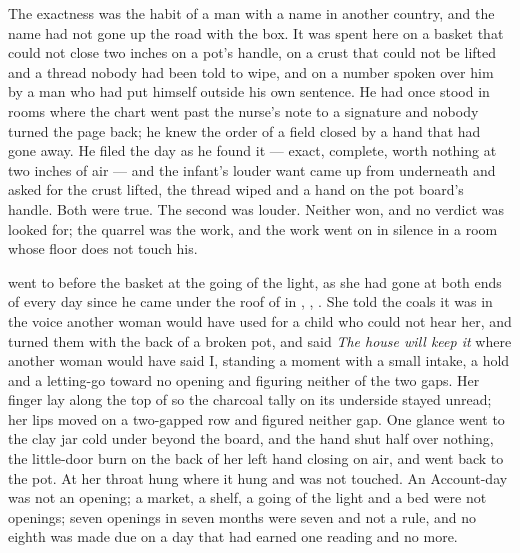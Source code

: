 The exactness was the habit of a man with a name in another country, and the name had not gone up the road with the box. It was spent here on a basket that could not close two inches on a pot's handle, on a crust that could not be lifted and a thread nobody had been told to wipe, and on a number spoken over him by a man who had put himself outside his own sentence. He had once stood in rooms where the chart went past the nurse's note to a signature and nobody turned the page back; he knew the order of a field closed by a hand that had gone away. He filed the day as he found it --- exact, complete, worth nothing at two inches of air --- and the infant's louder want came up from underneath and asked for the crust lifted, the thread wiped and a hand on the pot board's handle. Both were true. The second was louder. Neither won, and no verdict was looked for; the quarrel was the work, and the work went on in silence in a room whose floor does not touch his.

 went to  before the basket at the going of the light, as she had gone at both ends of every day since he came under the roof of  in , , . She told the coals it was  in the voice another woman would have used for a child who could not hear her, and turned them with the back of a broken pot, and said \emph{The house will keep it} where another woman would have said I, standing a moment with a small intake, a hold and a letting-go toward no opening and figuring neither of the two gaps. Her finger lay along the top of  so the charcoal tally on its underside stayed unread; her lips moved on a two-gapped row and figured neither gap. One glance went to the clay jar cold under  beyond the board, and the hand shut half over nothing, the little-door burn on the back of her left hand closing on air, and went back to the pot. At her throat  hung where it hung and was not touched. An Account-day was not an opening; a market, a shelf, a going of the light and a bed were not openings; seven openings in seven months were seven and not a rule, and no eighth was made due on a day that had earned one reading and no more.

